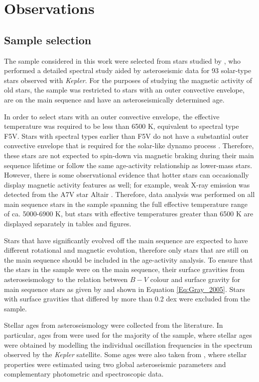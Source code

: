 \section{Observations}
\subsection{Sample selection}
\label{Chp4_obs_sample_selection}
The sample considered in this work were selected from stars studied by \citet{Bruntt_etal_2012}, who performed a detailed spectral study aided by asteroseismic data for 93 solar-type stars observed with \textit{Kepler}. For the purposes of studying the magnetic activity of old stars, the sample was restricted to stars with an outer convective envelope, are on the main sequence and have an asteroseismically determined age.

In order to select stars with an outer convective envelope, the effective temperature was required to be less than 6500 K, equivalent to spectral type F5V. Stars with spectral types earlier than F5V do not have a substantial outer convective envelope that is required for the solar-like dynamo process \citep{Pinsonneault_etal_2001}. Therefore, these stars are not expected to spin-down via magnetic braking during their main sequence lifetime or follow the same age-activity relationship as lower-mass stars. However, there is some observational evidence that hotter stars can occasionally display magnetic activity features as well; for example, weak X-ray emission was detected from the A7V star Altair \citep{Robrade_Schmitt_2009}. Therefore, data analysis was performed on all main sequence stars in the sample spanning the full effective temperature range of ca. 5000-6900 K, but stars with effective temperatures greater than 6500 K are displayed separately in tables and figures.

Stars that have significantly evolved off the main sequence are expected to have different rotational and magnetic evolution, therefore only stars that are still on the main sequence should be included in the age-activity analysis. To ensure that the stars in the sample were on the main sequence, their surface gravities \citep{Bruntt_etal_2012} from asteroseismology to the relation between $B-V$ colour and surface gravity for main sequence stars as given by \citet{Gray_2005} and shown in Equation \ref{Eq:Gray_2005}. Stars with surface gravities that differed by more than 0.2 dex were excluded from the sample.

Stellar ages from asteroseismology were collected from the literature. In particular, ages from \citet{Silva_Aguirre_etal_2017} were used for the majority of the sample, where stellar ages were obtained by modelling the individual oscillation frequencies in the spectrum observed by the \textit{Kepler} satellite. Some ages were also taken from \citet{Chaplin_etal_2014}, where stellar properties were estimated using two global asteroseismic parameters and complementary photometric and spectroscopic data.

